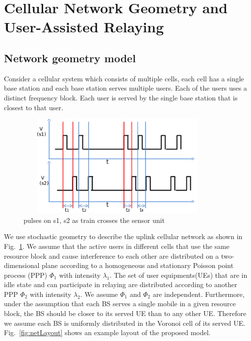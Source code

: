 \documentclass[titlepage]{article}
\begin{document}
\section{Cellular Network Geometry and User-Assisted Relaying}

\subsection{Network geometry model}
Consider a cellular system which consists of multiple
cells, each cell has a single base station and each base station
serves multiple users. Each of the users uses a distinct frequency
block. Each user is served by the single base station that
is closest to that user.

\begin{figure}[H]
\begin{center}
\includegraphics[height = 2in,width=4in,angle=00]{figures/8w_no_miss.png}
\caption{\small pulses on s1, s2 as train crosses the sensor unit}
\label{fig:sysModel}
\end{center}
\end{figure}

\par We use stochastic geometry to
describe the uplink cellular network as shown in Fig.~\ref{fig:sysModel}. We
assume that the active users in different cells that use the same resource block and cause interference to each other are distributed on a two-dimensional plane according to a homogeneous and stationary Poisson point process (PPP)
$\Phi_1$ with intensity $\lambda_1$. The set of user equipments(UEs) that are in idle state and can participate in relaying are distributed according to another PPP $\Phi_2$ with intensity $\lambda_2$. We assume $\Phi_1$ and $\Phi_2$ are independent. Furthermore, under the assumption that each BS serves a
single mobile in a given resource block, the BS should be closer to its served UE than to any other UE. Therefore we assume each BS is uniformly distributed in the Voronoi cell of its served UE. Fig.~\ref{fig:netLayout} shows an example layout of the proposed model.
\end{document}

